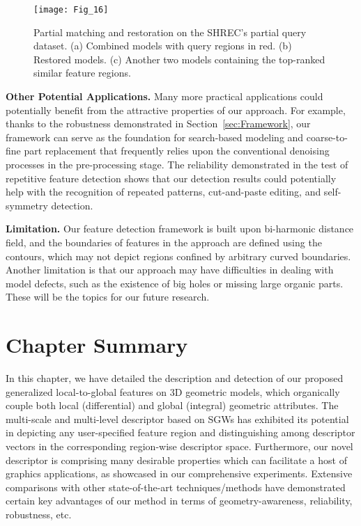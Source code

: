 \begin{figure}[!to]
\texttt{[image: Fig\_16]}
\caption[Partial shape matching and restoration.]
 {Partial matching and restoration on the SHREC's partial query
  dataset. (a) Combined models with query regions in red. (b) Restored
  models.  (c) Another two models containing the top-ranked similar
  feature regions.}
\label{partial-query}
\end{figure}

\textbf{Other Potential Applications.} Many more practical applications
could potentially benefit from the attractive properties of our
approach. For example, thanks to the robustness demonstrated in
Section~\ref{sec:Framework}, our framework can serve as the foundation
for search-based modeling and coarse-to-fine part replacement that
frequently relies upon the conventional denoising processes in the
pre-processing stage. The reliability demonstrated in the test of
repetitive feature detection shows that our detection results could
potentially help with the recognition of repeated patterns,
cut-and-paste editing, and self-symmetry detection.

\textbf{Limitation.} Our feature detection framework is built upon
bi-harmonic distance field, and the boundaries of features in the
approach are defined using the contours, which may not depict regions
confined by arbitrary curved boundaries. Another limitation is that
our approach may have difficulties in dealing with model defects, such
as the existence of big holes or missing large organic parts. These
will be the topics for our future research.


\section{Chapter Summary}
\label{sec:Con}

In this chapter, we have detailed the description and detection of our
proposed generalized local-to-global features on 3D geometric models,
which organically couple both local (differential) and global
(integral) geometric attributes. The multi-scale and multi-level
descriptor based on SGWs has exhibited its potential in depicting any
user-specified feature region and distinguishing among descriptor
vectors in the corresponding region-wise descriptor space.
Furthermore, our novel descriptor is comprising many desirable
properties which can facilitate a host of graphics applications, as
showcased in our comprehensive experiments. Extensive comparisons with
other state-of-the-art techniques/methods have demonstrated certain
key advantages of our method in terms of geometry-awareness,
reliability, robustness, etc.

